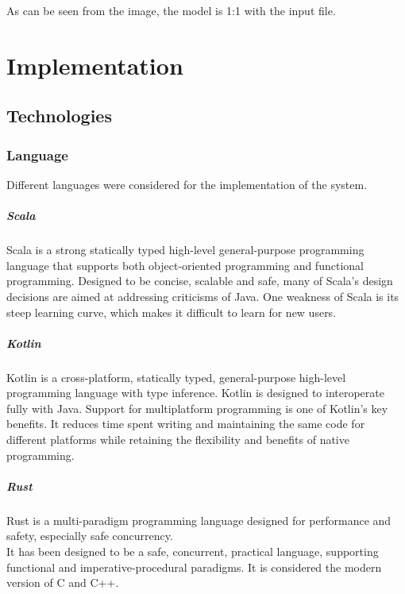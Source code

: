\documentclass[12pt,a4paper,openright,twoside]{book}
\begin{document}
As can be seen from the image, the model is 1:1 with the input file.

\chapter{Implementation}

\section{Technologies}

\subsection{Language}
Different languages were considered for the implementation of the system.

\paragraph*{Scala}
Scala is a strong statically typed high-level general-purpose programming language that supports both object-oriented 
programming and functional programming. 
Designed to be concise, scalable and safe, many of Scala's design decisions are aimed at addressing criticisms of Java.
One weakness of Scala is its steep learning curve, which makes it difficult to learn for new users.

\paragraph*{Kotlin}
Kotlin is a cross-platform, statically typed, general-purpose high-level programming language with type inference. 
Kotlin is designed to interoperate fully with Java.
Support for multiplatform programming is one of Kotlin’s key benefits. It reduces time spent writing and maintaining 
the same code for different platforms while retaining the flexibility and benefits of native programming.

\paragraph*{Rust}

Rust is a multi-paradigm programming language designed for performance and safety, especially safe concurrency. \\
It has been designed to be a safe, concurrent, practical language, supporting functional and imperative-procedural paradigms.
It is considered the modern version of C and C++.
\end{document}
